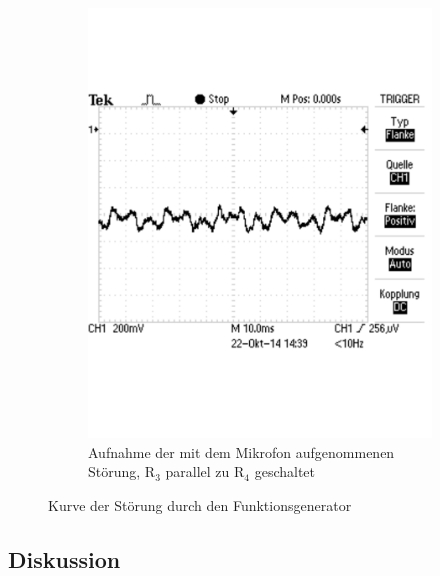 \documentclass[12pt,a4paper]{article}
\begin{document}
\begin{figure}[H]
\begin{subfigure}[tb]{0.48\textwidth}
                \includegraphics[width=\textwidth , scale = 0.4]{2_3_r3p_st.pdf}
                \caption[Aufnahme der mit dem Mikrofon aufgenommenen Störung, R$_3$ parallel zu R$_4$ geschaltet]{Aufnahme der mit dem Mikrofon aufgenommenen Störung, R$_3$ parallel zu R$_4$ geschaltet}
  				\label{fig:2_3_r3p_st}
        \end{subfigure}
        \caption{Kurve der Störung durch den Funktionsgenerator}
        \label{fig:2_2_stoer_vergleich}
\end{figure}



\subsection{Diskussion}
\end{document}
